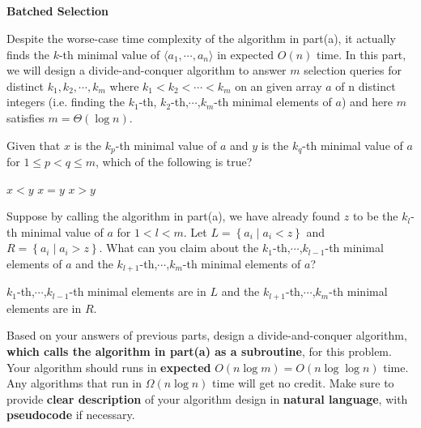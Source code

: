 \begin{parts}
  \newpage

  \part{} \textbf{Batched Selection} \par

  Despite the worse-case time complexity of the algorithm in part(a), it actually finds the $k$-th minimal value of \(\langle a_1,\cdots,a_n\rangle\) in expected $O(n)$ time. In this part, we will design a divide-and-conquer algorithm to answer $m$ selection queries for distinct $k_1, k_2, \cdots, k_m$ where $k_1 < k_2 < \cdots < k_m$ on an given array $a$ of n distinct integers (i.e. finding the $k_1$-th, $k_2$-th,$\cdots$,$k_m$-th minimal elements of $a$) and here $m$ satisfies $m = \Theta(\log n)$.

  \begin{subparts}
    \subpart[1] Given that $x$ is the $k_p$-th minimal value of $a$ and $y$ is the $k_q$-th minimal value of $a$ for $1 \leq p < q \leq m$, which of the following is true?

    \begin{oneparcheckboxes}
      \CorrectChoice $x < y$
      \choice $x = y$
      \choice $x > y$
    \end{oneparcheckboxes}



    \subpart[2] Suppose by calling the algorithm in part(a), we have already found $z$ to be the $k_l$-th minimal value of $a$ for $1 < l < m$. Let $L = \left\{a_i \mid a_i < z\right\}$ and $R = \left\{a_i \mid a_i > z\right\}$. What can you claim about the $k_1$-th,$\cdots$,$k_{l-1}$-th minimal elements of $a$ and the $k_{l+1}$-th,$\cdots$,$k_{m}$-th minimal elements of $a$?

    \begin{solution}
      $k_1$-th,$\cdots$,$k_{l-1}$-th minimal elements are in $L$ and the $k_{l+1}$-th,$\cdots$,$k_{m}$-th minimal elements are in $R$.
    \end{solution}

    \subpart[6] Based on your answers of previous parts, design a divide-and-conquer algorithm, \textbf{which calls the algorithm in part(a) as a subroutine}, for this problem. Your algorithm should runs in \textbf{expected} $O(n \log m) = O(n \log \log n)$ time. Any algorithms that run in $\Omega(n \log n)$ time will get no credit. Make sure to provide \textbf{clear description} of your algorithm design in \textbf{natural language}, with \textbf{pseudocode} if necessary.


\end{subparts}
\end{parts}
